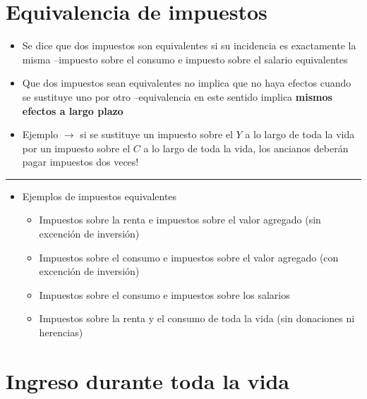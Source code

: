 \documentclass[
  letterpaper,
  DIV=11,
  numbers=noendperiod]{scrartcl}
\providecommand{\tightlist}{%
  \setlength{\itemsep}{0pt}\setlength{\parskip}{0pt}}\usepackage{longtable,booktabs,array}
\begin{document}
\section{\texorpdfstring{\textbf{Equivalencia de
impuestos}}{Equivalencia de impuestos}}\label{equivalencia-de-impuestos}

\begin{itemize}
\tightlist
\item
  Se dice que dos impuestos son equivalentes si su incidencia es
  exactamente la misma --impuesto sobre el consumo e impuesto sobre el
  salario equivalentes
\item
  Que dos impuestos sean equivalentes no implica que no haya efectos
  cuando se sustituye uno por otro --equivalencia en este sentido
  implica \textbf{mismos efectos a largo plazo}
\item
  Ejemplo \(\longrightarrow\) si se sustituye un impuesto sobre el \(Y\)
  a lo largo de toda la vida por un impuesto sobre el \(C\) a lo largo
  de toda la vida, los ancianos deberán pagar impuestos dos veces!
\end{itemize}

\begin{center}\rule{0.5\linewidth}{0.5pt}\end{center}

\begin{itemize}
\tightlist
\item
  Ejemplos de impuestos equivalentes

  \begin{itemize}
  \tightlist
  \item
    Impuestos sobre la renta e impuestos sobre el valor agregado (sin
    excención de inversión)
  \item
    Impuestos sobre el consumo e impuestos sobre el valor agregado (con
    excención de inversión)
  \item
    Impuestos sobre el consumo e impuestos sobre los salarios
  \item
    Impuestos sobre la renta y el consumo de toda la vida (sin
    donaciones ni herencias)
  \end{itemize}
\end{itemize}

\section{\texorpdfstring{\textbf{Ingreso durante toda la
vida}}{Ingreso durante toda la vida}}\label{ingreso-durante-toda-la-vida}
\end{document}
